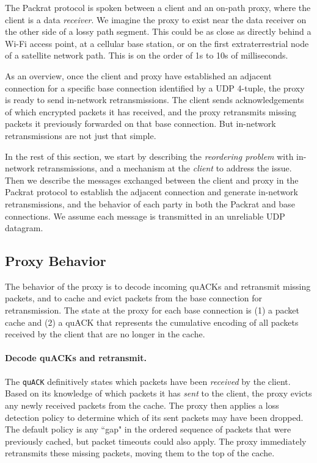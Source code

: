 The Packrat protocol is spoken between a client and an on-path proxy, where the
client is a data \textit{receiver}. We imagine the proxy to exist near the data
receiver on the other side of a lossy path segment. This could be as close as
directly behind a Wi-Fi access point, at a cellular base station, or on the
first extraterrestrial node of a satellite network path. This is on the order
of 1s to 10s of milliseconds.

As an overview, once the client and proxy have established an adjacent
connection for a specific base connection identified by a UDP 4-tuple, the
proxy is ready to send in-network retransmissions. The client sends
acknowledgements of which encrypted packets it has received, and the proxy retransmits missing
packets it previously forwarded on that base connection.
But in-network retransmissions are not just that simple.

In the rest of this section, we start by describing the \textit
{reordering problem} with in-network retransmissions, and a mechanism at
the \textit{client} to address the issue. Then we describe the messages
exchanged between the client and proxy in the Packrat protocol to establish the
adjacent connection and generate in-network retransmissions,
and the behavior of each party in both the Packrat and base
connections. We assume each message is transmitted in an unreliable UDP
datagram.

\subsection{Proxy Behavior}

The behavior of the proxy is to decode incoming quACKs and retransmit missing
packets, and to cache and evict packets from the base connection for
retransmission. The state at the proxy for each base connection is (1) a packet
cache and (2) a quACK that represents the cumulative encoding of all packets
received by the client that are no longer in the cache.

\paragraph{Decode quACKs and retransmit.}

The \texttt{quACK} definitively states which packets have been \textit{received}
by the client. Based on its knowledge of which packets it has \textit{sent} to
the client, the proxy evicts any newly received packets from the cache. The
proxy then applies a loss detection policy to determine which of its sent
packets may have been dropped. The default
policy is any ``gap" in the ordered sequence of packets that were previously
cached, but packet timeouts could also apply. The proxy immediately retransmits
these missing packets, moving them to the top of the cache.

